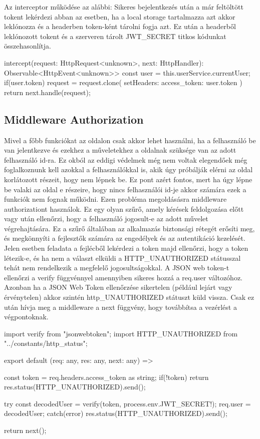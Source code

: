 Az interceptor működése az alábbi: Sikeres bejelentkezés után a már feltöltött tokent lekérdezi abban az esetben, ha a local storage tartalmazza azt akkor leklónozza és a headerben token-ként tárolni fogja azt. Ez után a headerből leklónozott tokent és a szerveren tárolt JWT\_SECRET titkos kódunkat összehasonlítja.

\begin{python}[caption={Interceptor},captionpos=b]
    intercept(request: HttpRequest<unknown>,
    next: HttpHandler): Observable<HttpEvent<unknown>> {
    const user = this.userService.currentUser;
    if(user.token)
    {
      request = request.clone({
        setHeaders:{
          access_token: user.token
        }
      })
    }
    return next.handle(request);
  }
\end{python}

\subsection{Middleware Authorization}
Mivel a főbb funkciókat az oldalon csak akkor lehet használni, ha a felhasználó be van jelentkezve és ezekhez a műveletekhez a oldalnak szüksége van az adott felhasználó id-ra. Ez okból az eddigi védelmek még nem voltak elegendőek még foglalkoznunk kell azokkal a felhasználókkal is, akik úgy próbálják elérni az oldal korlátozott részeit, hogy nem lépnek be. Ez pont azért fontos, mert ha úgy lépne be valaki az oldal e részeire, hogy nincs felhasználói id-je akkor számára ezek a funkciók nem fognak működni. Ezen probléma megoldásásra middleware authorizationt használok. Ez egy olyan szűrő, amely kérések feldolgozása előtt vagy után ellenőrzi, hogy a felhasználó jogosult-e az adott művelet végrehajtására. Ez a szűrő általában az alkalmazás biztonsági rétegét erősíti meg, és megkönnyíti a fejlesztők számára az engedélyek és az autentikáció kezelését. Jelen esetben feladata a fejlécből lekérdezi a token majd ellenőrzi, hogy a token létezik-e, és ha nem a választ elküldi a HTTP\_UNAUTHORIZED státusszal tehát nem rendelkezik a megfelelő jogosultságokkal. A JSON web token-t ellenőrzi a verify függvénnyel amennyiben sikeres hozzá a req.user változóhoz. Azonban ha a JSON Web Token ellenőrzése sikertelen (például lejárt vagy érvénytelen) akkor szintén http\_UNAUTHORIZED státuszt küld vissza. Csak ez után hívja meg a middleware a next függvény, hogy továbbítsa a vezérlést a végpontoknak.

\begin{python}[caption={Middleware Authorization},captionpos=b]
import { verify } from "jsonwebtoken";
import { HTTP_UNAUTHORIZED } from "../constants/http_status";

export default (req: any, res: any, next: any) => {
    const token = req.headers.access_token as string;
    if(!token) return res.status(HTTP_UNAUTHORIZED).send();

    try{
        const decodedUser = verify(token, process.env.JWT_SECRET!);
        req.user = decodedUser;
    }catch(error){
        res.status(HTTP_UNAUTHORIZED).send();
    }

    return next();
}
\end{python}


